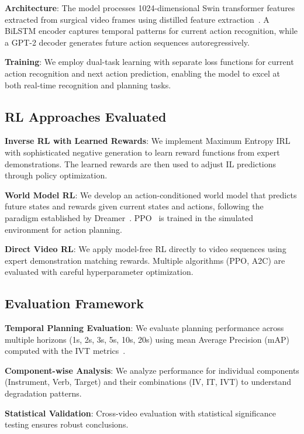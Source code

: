 \documentclass[runningheads]{llncs}
\begin{document}
\textbf{Architecture}: The model processes 1024-dimensional Swin transformer features~\cite{liu2021swin} extracted from surgical video frames using distilled feature extraction~\cite{yamlahi2023self}. A BiLSTM encoder captures temporal patterns for current action recognition, while a GPT-2 decoder generates future action sequences autoregressively.

\textbf{Training}: We employ dual-task learning with separate loss functions for current action recognition and next action prediction, enabling the model to excel at both real-time recognition and planning tasks.

\subsection{RL Approaches Evaluated}

\textbf{Inverse RL with Learned Rewards}: We implement Maximum Entropy IRL~\cite{ziebart2008maximum} with sophisticated negative generation to learn reward functions from expert demonstrations. The learned rewards are then used to adjust IL predictions through policy optimization.

\textbf{World Model RL}: We develop an action-conditioned world model that predicts future states and rewards given current states and actions, following the paradigm established by Dreamer~\cite{hafner2020dream}. PPO~\cite{schulman2017proximal} is trained in the simulated environment for action planning.

\textbf{Direct Video RL}: We apply model-free RL directly to video sequences using expert demonstration matching rewards. Multiple algorithms (PPO, A2C) are evaluated with careful hyperparameter optimization.

\subsection{Evaluation Framework}

\textbf{Temporal Planning Evaluation}: We evaluate planning performance across multiple horizons (1s, 2s, 3s, 5s, 10s, 20s) using mean Average Precision (mAP) computed with the IVT metrics~\cite{nwoye2022data,nwoye2022cholect50}.

\textbf{Component-wise Analysis}: We analyze performance for individual components (Instrument, Verb, Target) and their combinations (IV, IT, IVT) to understand degradation patterns.

\textbf{Statistical Validation}: Cross-video evaluation with statistical significance testing ensures robust conclusions.
\end{document}
